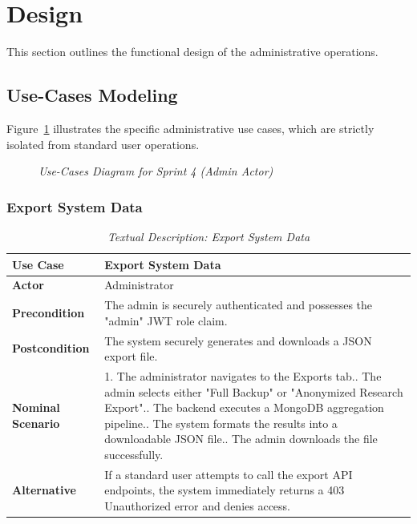 \section{Design}
This section outlines the functional design of the administrative operations.

\subsection{Use-Cases Modeling}
Figure~\ref{fig:sprint4_usecase} illustrates the specific administrative use cases, which are strictly isolated from standard user operations.

\begin{figure}[H]
	\centering
	\caption{\textit{Use-Cases Diagram for Sprint 4 (Admin Actor)}}
	\label{fig:sprint4_usecase}
\end{figure}

\subsubsection{Export System Data}
\begin{table}[H]
	\centering
	\footnotesize
	\renewcommand{\arraystretch}{1.5}
	\begin{tabular}{|p{3cm}|p{11.5cm}|}
		\hline
		\rowcolor[HTML]{1F3864}
		{\color{white}\textbf{Use Case}} & {\color{white}\textbf{Export System Data}} \\
		\hline
		\textbf{Actor} & Administrator \\
		\hline
		\textbf{Precondition} & The admin is securely authenticated and possesses the "admin" JWT role claim. \\
		\hline
		\textbf{Postcondition} & The system securely generates and downloads a JSON export file. \\
		\hline
		\textbf{Nominal Scenario} & 
		1. The administrator navigates to the Exports tab.\newline
		2. The admin selects either "Full Backup" or "Anonymized Research Export".\newline
		3. The backend executes a MongoDB aggregation pipeline.\newline
		4. The system formats the results into a downloadable JSON file.\newline
		5. The admin downloads the file successfully. \\
		\hline
		\textbf{Alternative} & 
		If a standard user attempts to call the export API endpoints, the system immediately returns a 403 Unauthorized error and denies access. \\
		\hline
	\end{tabular}
	\caption{\textit{Textual Description: Export System Data}}
\end{table}

